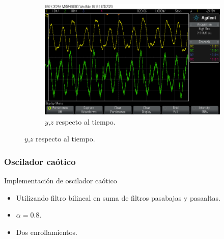\documentclass[10pt]{beamer}
\begin{document}
\begin{frame}
\begin{figure}[!ht]
\begin{subfigure}[b]{0.3\textwidth}
	    \includegraphics[trim={6cm 2cm 9cm 2cm},clip,width=\textwidth]{../imagenes/Y7_Y_vs_Z_signal.png}
	    \caption{$y$,$z$ respecto al tiempo.}
	    \label{fig:Y7_Y_vs_Z_signal}
	  \end{subfigure}
	\end{figure}	
	\end{frame}
	
	
	
	
		\begin{frame}
		\frametitle{Oscilador caótico}
		\begin{block}{Implementación de oscilador caótico}
		\begin{itemize}
			\item Utilizando filtro bilineal en suma de filtros pasabajas y pasaaltas.
			\item $\alpha = 0.8$.
			\item Dos enrollamientos.
		\end{itemize}
		\end{block}
	\end{frame}	
	
	
	
	
	
	
	
\end{document}
